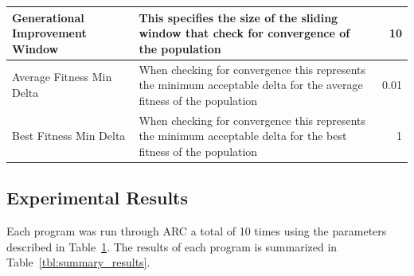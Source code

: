 \documentclass{llncs}
\begin{document}
\begin{table}[!t]
\begin{center}
\begin{tabular}{|p{3cm}|p{10cm}|r|}
\hline
Generational Improvement Window & This specifies the size of the sliding window that check for convergence of the population & 10\\
\hline
Average Fitness Min Delta & When checking for convergence this represents the minimum acceptable delta for the average fitness of the population & 0.01\\
\hline
Best Fitness Min Delta & When checking for convergence this represents the minimum acceptable delta for the best fitness of the population & 1\\
\hline
\end{tabular}
\label{tbl:used_parameters}
\end{center}
\end{table}

\subsection{Experimental Results}
\label{sec:experimental_results}

Each program was run through ARC a total of 10 times using the parameters
described in Table~\ref{tbl:used_parameters}. The results of each program is
summarized in Table~\ref{tbl:summary_results}.
\end{document}
